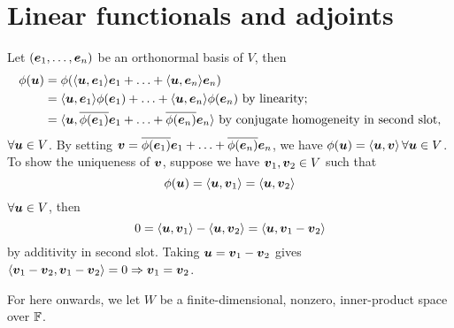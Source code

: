 \documentclass{report}
\begin{document}
	\section{Linear functionals and adjoints}
	\vspace{1mm}
	\begin{myproof}
		Let $(\bme_1,\ldots,\bme_n)$ be an orthonormal basis of $V$, then
		\begin{align*}
			\phi(\bmu)&=\phi(\lsp\bmu,\bme_1\rsp\bme_1+\ldots+\lsp\bmu,\bme_n\rsp\bme_n)\\
			&=\lsp\bmu,\bme_1\rsp\phi(\bme_1)+\ldots+\lsp\bmu,\bme_n\rsp\phi(\bme_n)\text{ by linearity;}\\
			&= \lsp\bmu,\overline{\phi(\bme_1)}\bme_1+\ldots+\overline{\phi(\bme_n)}\bme_n\rsp \text{ by conjugate homogeneity in second slot,}
		\end{align*}
		$\forall \bmu\in V$. By setting $\bmv=\overline{\phi(\bme_1)}\bme_1+\ldots+\overline{\phi(\bme_n)}\bme_n$, we have $\phi(\bmu)=\lsp\bmu,\bmv\rsp\,\forall \bmu\in V$.\\
		
		To show the uniqueness of $\bmv$, suppose we have $\bmv_1,\bmv_2\in V$ such that 
		$$\phi(\bmu)=\lsp\bmu,\bmv_1\rsp=\lsp\bmu,\bmv_2\rsp$$
		$\forall \bmu\in V$, then
		$$0=\lsp\bmu,\bmv_1\rsp-\lsp\bmu,\bmv_2\rsp=\lsp\bmu,\bmv_1-\bmv_2\rsp$$
		by additivity in second slot. Taking $\bmu=\bmv_1-\bmv_2$ gives $\lsp\bmv_1-\bmv_2,\bmv_1-\bmv_2\rsp=0\Rightarrow \bmv_1=\bmv_2$. 
	\end{myproof}
	
	For here onwards, we let $W$ be a finite-dimensional, nonzero, inner-product space over $\FF$.\\
	
	\vspace{1mm}
	
\end{document}

